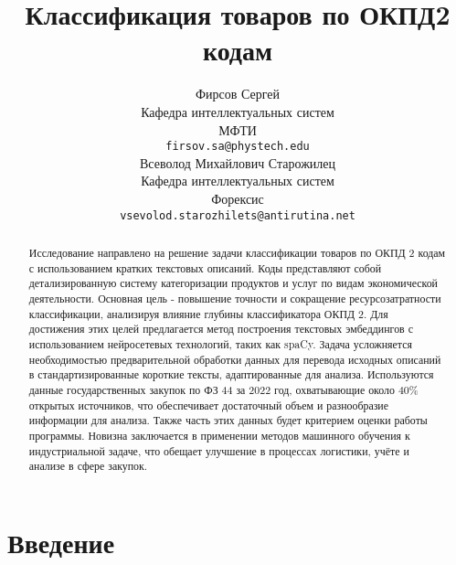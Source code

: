 \documentclass{article}
\title{Классификация товаров по ОКПД2 кодам}
\author{ Фирсов Сергей \\
        Кафедра интеллектуальных систем\\
	МФТИ\\
	\texttt{firsov.sa@phystech.edu} \\
	\And
	Всеволод Михайлович Старожилец \\
	Кафедра интеллектуальных систем\\
	Форексис\\
	\texttt{vsevolod.starozhilets@antirutina.net} \\
}
\date{}
\begin{document}
\maketitle

\begin{abstract}
    Исследование направлено на решение задачи классификации товаров по ОКПД 2 кодам с использованием кратких текстовых описаний. Коды представляют собой детализированную систему категоризации продуктов и услуг по видам экономической деятельности. Основная цель - повышение точности и сокращение ресурсозатратности классификации, анализируя влияние глубины классификатора ОКПД 2. Для достижения этих целей предлагается метод построения текстовых эмбеддингов с использованием нейросетевых технологий, таких как spaCy. Задача усложняется необходимостью предварительной обработки данных для перевода исходных описаний в стандартизированные короткие тексты, адаптированные для анализа. Используются данные государственных закупок по ФЗ 44 за 2022 год, охватывающие около 40\% открытых источников, что обеспечивает достаточный объем и разнообразие информации для анализа. Также часть этих данных будет критерием оценки работы программы. Новизна заключается в применении методов машинного обучения к индустриальной задаче, что обещает улучшение в процессах логистики, учёте и анализе в сфере закупок. 


 
\end{abstract}



\section{Введение}





\end{document}
